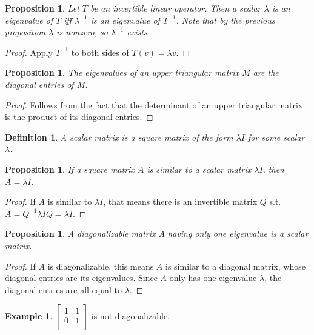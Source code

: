 \documentclass[12pt]{article}
\theoremstyle{plain}
\newtheorem{proposition}[theorem]{Proposition}
\newtheorem{definition}[theorem]{Definition}
\theoremstyle{definition}
\newtheorem{example}[theorem]{Example}
\theoremstyle{remark}
\begin{document}
\begin{proposition}
Let $T$ be an invertible linear operator. Then a scalar $\lambda$ is an eigenvalue of $T$ iff $\lambda^{-1}$ is an eigenvalue of $T^{-1}$. Note that by the previous proposition $\lambda$ is nonzero, so $\lambda^{-1}$ exists.
\end{proposition}

\begin{proof}
Apply $T^{-1}$ to both sides of $T(v) = \lambda v$.
\end{proof}

\begin{proposition}
The eigenvalues of an upper triangular matrix $M$ are the diagonal entries of $M$.
\end{proposition}

\begin{proof}
Follows from the fact that the determinant of an upper triangular matrix is the product of its diagonal entries.
\end{proof}

\begin{definition}
A scalar matrix is a square matrix of the form $\lambda I$ for some scalar $\lambda$.
\end{definition}

\begin{proposition}
If a square matrix $A$ is similar to a scalar matrix $\lambda I$, then $A = \lambda I$.
\end{proposition}

\begin{proof}
If $A$ is similar to $\lambda I$, that means there is an invertible matrix $Q$ s.t. $A = Q^{-1} \lambda I Q = \lambda I$.
\end{proof}

\begin{proposition}
A diagonalizable matrix $A$ having only one eigenvalue is a scalar matrix.
\end{proposition}

\begin{proof}
If $A$ is diagonalizable, this means $A$ is similar to a diagonal matrix, whose diagonal entries are its eigenvalues. Since $A$ only has one eigenvalue $\lambda$, the diagonal entries are all equal to $\lambda$.
\end{proof}

\begin{example}
$\begin{bmatrix}
1 & 1 \\
0 & 1 \\
\end{bmatrix}$ is not diagonalizable.
\end{example}
\end{document}
